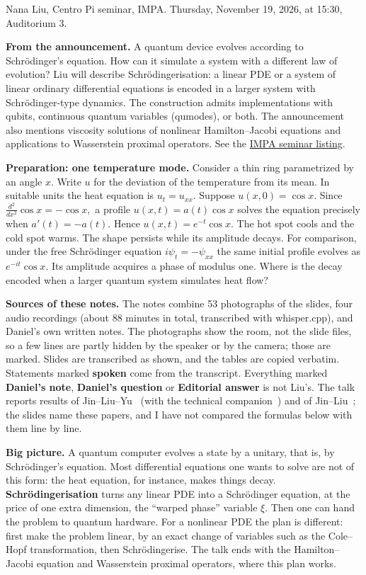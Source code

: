 \noindent
Nana Liu, Centro Pi seminar, IMPA.
Thursday, November 19, 2026, at 15:30,
Auditorium 3.

\medskip\noindent
{\bf From the announcement.}
A quantum device evolves according to
Schr\"odinger's equation. How can it
simulate a system with a different law
of evolution? Liu will describe
Schr\"odingerisation: a linear PDE or a
system of linear ordinary differential
equations is encoded in a larger system
with Schr\"odinger-type dynamics.
The construction admits implementations
with qubits, continuous quantum variables
(qumodes), or both. The announcement also
mentions viscosity solutions of nonlinear
Hamilton--Jacobi equations and applications
to Wasserstein proximal operators.
See the \href{https://impa.br/seminarios/}
{IMPA seminar listing}.

\medskip\noindent
{\bf Preparation: one temperature mode.}
Consider a thin ring parametrized by an
angle $x$. Write $u$ for the deviation of
the temperature from its mean. In suitable
units the heat equation is $u_t=u_{xx}$.
Suppose $u(x,0)=\cos x$. Since
$
\frac{d^2}{dx^2}\cos x=-\cos x,
$
a profile $u(x,t)=a(t)\cos x$ solves the
equation precisely when $a'(t)=-a(t)$.
Hence
$
u(x,t)=e^{-t}\cos x.
$
The hot spot cools and the cold spot
warms. The shape persists while its
amplitude decays. For comparison, under
the free Schr\"odinger equation
$i\psi_t=-\psi_{xx}$ the same initial
profile evolves as $e^{-it}\cos x$.
Its amplitude acquires a phase of modulus
one. Where is the decay encoded when a
larger quantum system simulates heat flow?

\medskip\noindent
{\bf Sources of these notes.}
The notes combine 53 photographs of the
slides, four audio recordings (about 88
minutes in total, transcribed with
whisper.cpp), and Daniel's own written
notes. The photographs show the room, not
the slide files, so a few lines are partly
hidden by the speaker or by the camera;
those are marked. Slides are transcribed as
shown, and the tables are copied verbatim.
Statements marked {\bf spoken} come from the
transcript. Everything marked {\bf Daniel's
note}, {\bf Daniel's question} or {\bf
Editorial answer} is not Liu's. The talk
reports results of
Jin--Liu--Yu~\cite{jly-prl} (with the
technical companion~\cite{jly-pra}) and of
Jin--Liu~\cite{jl-analog}; the slides name
these papers, and I have not compared the
formulas below with them line by line.

\medskip\noindent
{\bf Big picture.}
A quantum computer evolves a state by a
unitary, that is, by Schr\"odinger's
equation. Most differential equations one
wants to solve are not of this form: the
heat equation, for instance, makes things
decay. {\bf Schr\"odingerisation} turns any
linear PDE into a Schr\"odinger equation,
at the price of one extra dimension, the
``warped phase'' variable $\xi$. Then one
can hand the problem to quantum hardware.
For a nonlinear PDE the plan is different:
first make the problem linear, by an exact
change of variables such as the Cole--Hopf
transformation, then Schr\"odingerise. The
talk ends with the Hamilton--Jacobi
equation and Wasserstein proximal
operators, where this plan works.

